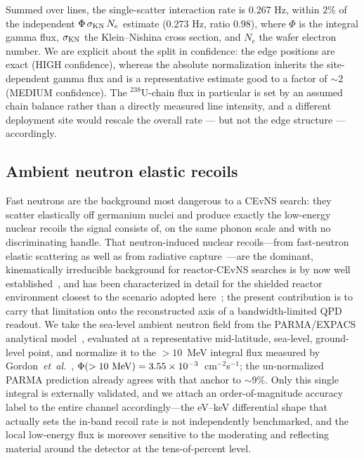 Summed over lines, the single-scatter interaction rate is $0.267$ Hz,
within $2\%$ of the independent $\Phi\,\sigma_{\rm KN}\,N_e$ estimate
($0.273$ Hz, ratio $0.98$), where $\Phi$ is the integral gamma flux,
$\sigma_{\rm KN}$ the Klein--Nishina cross section, and $N_e$ the wafer
electron number. We are explicit about the split in confidence: the edge
positions are exact (HIGH confidence), whereas the absolute
normalization inherits the site-dependent gamma flux and is a
representative estimate good to a factor of $\sim$2 (MEDIUM confidence).
The $^{238}$U-chain flux in particular is set by an assumed chain balance
rather than a directly measured line intensity, and a different
deployment site would rescale the overall rate --- but not the edge
structure --- accordingly.

\subsection{Ambient neutron elastic recoils}
\label{sec:neutrons}

Fast neutrons are the background most dangerous to a CEvNS search: they
scatter elastically off germanium nuclei and produce exactly the low-energy
nuclear recoils the signal consists of, on the same phonon scale and with no
discriminating handle. That neutron-induced nuclear recoils---from
fast-neutron elastic scattering as well as from radiative
capture~\cite{biffl2023}---are the dominant, kinematically irreducible
background for reactor-CEvNS searches is by now well
established~\cite{conusneutron2019,ricochetneutron2023}, and has been
characterized in detail for the shielded reactor environment closest to the
scenario adopted here~\cite{nucleusbkg2026}; the present contribution is to
carry that limitation onto the reconstructed axis of a bandwidth-limited QPD
readout. We take the sea-level ambient neutron field from the
PARMA/EXPACS analytical model~\cite{sato2015}, evaluated at a representative
mid-latitude, sea-level, ground-level point, and normalize it to the
$>10$~MeV integral flux measured by Gordon~\emph{et~al.}~\cite{gordon2004},
$\Phi(>10~{\rm MeV})=3.55\times10^{-3}$~cm$^{-2}$s$^{-1}$; the un-normalized
PARMA prediction already agrees with that anchor to $\sim$9\%. Only this
single integral is externally validated, and we attach an
order-of-magnitude accuracy label to the entire channel accordingly---the
eV--keV differential shape that actually sets the in-band recoil rate is not
independently benchmarked, and the local low-energy flux is moreover
sensitive to the moderating and reflecting material around the detector at
the tens-of-percent level.


